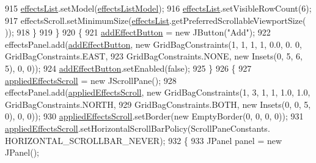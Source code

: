 \begin{DoxyCode}
915                     \mbox{\hyperlink{classorg_1_1newdawn_1_1slick_1_1tools_1_1hiero_1_1_hiero_aff0431ced360227e02cdf9bcd21fd4d2}{effectsList}}.setModel(\mbox{\hyperlink{classorg_1_1newdawn_1_1slick_1_1tools_1_1hiero_1_1_hiero_ace6d63639e4675334744afbdad439e98}{effectsListModel}});
916                     \mbox{\hyperlink{classorg_1_1newdawn_1_1slick_1_1tools_1_1hiero_1_1_hiero_aff0431ced360227e02cdf9bcd21fd4d2}{effectsList}}.setVisibleRowCount(6);
917                     effectsScroll.setMinimumSize(\mbox{\hyperlink{classorg_1_1newdawn_1_1slick_1_1tools_1_1hiero_1_1_hiero_aff0431ced360227e02cdf9bcd21fd4d2}{effectsList}}.getPreferredScrollableViewportSize(
      ));
918                 \}
919             \}
920             \{
921                 \mbox{\hyperlink{classorg_1_1newdawn_1_1slick_1_1tools_1_1hiero_1_1_hiero_a7dd9542f73944fa537d025f2c87f1b20}{addEffectButton}} = \textcolor{keyword}{new} JButton(\textcolor{stringliteral}{"Add"});
922                 effectsPanel.add(\mbox{\hyperlink{classorg_1_1newdawn_1_1slick_1_1tools_1_1hiero_1_1_hiero_a7dd9542f73944fa537d025f2c87f1b20}{addEffectButton}}, \textcolor{keyword}{new} GridBagConstraints(1, 1, 1, 1, 0.0, 0.
      0, GridBagConstraints.EAST,
923                     GridBagConstraints.NONE, \textcolor{keyword}{new} Insets(0, 5, 6, 5), 0, 0));
924                 \mbox{\hyperlink{classorg_1_1newdawn_1_1slick_1_1tools_1_1hiero_1_1_hiero_a7dd9542f73944fa537d025f2c87f1b20}{addEffectButton}}.setEnabled(\textcolor{keyword}{false});
925             \}
926             \{
927                 \mbox{\hyperlink{classorg_1_1newdawn_1_1slick_1_1tools_1_1hiero_1_1_hiero_a0ee49b3aeb7a3ff8350e273ec5f54df9}{appliedEffectsScroll}} = \textcolor{keyword}{new} JScrollPane();
928                 effectsPanel.add(\mbox{\hyperlink{classorg_1_1newdawn_1_1slick_1_1tools_1_1hiero_1_1_hiero_a0ee49b3aeb7a3ff8350e273ec5f54df9}{appliedEffectsScroll}}, \textcolor{keyword}{new} GridBagConstraints(1, 3, 1, 
      1, 1.0, 1.0, GridBagConstraints.NORTH,
929                     GridBagConstraints.BOTH, \textcolor{keyword}{new} Insets(0, 0, 5, 0), 0, 0));
930                 \mbox{\hyperlink{classorg_1_1newdawn_1_1slick_1_1tools_1_1hiero_1_1_hiero_a0ee49b3aeb7a3ff8350e273ec5f54df9}{appliedEffectsScroll}}.setBorder(\textcolor{keyword}{new} EmptyBorder(0, 0, 0, 0));
931                 \mbox{\hyperlink{classorg_1_1newdawn_1_1slick_1_1tools_1_1hiero_1_1_hiero_a0ee49b3aeb7a3ff8350e273ec5f54df9}{appliedEffectsScroll}}.setHorizontalScrollBarPolicy(ScrollPaneConstants.
      HORIZONTAL\_SCROLLBAR\_NEVER);
932                 \{
933                     JPanel panel = \textcolor{keyword}{new} JPanel();

\end{DoxyCode}
